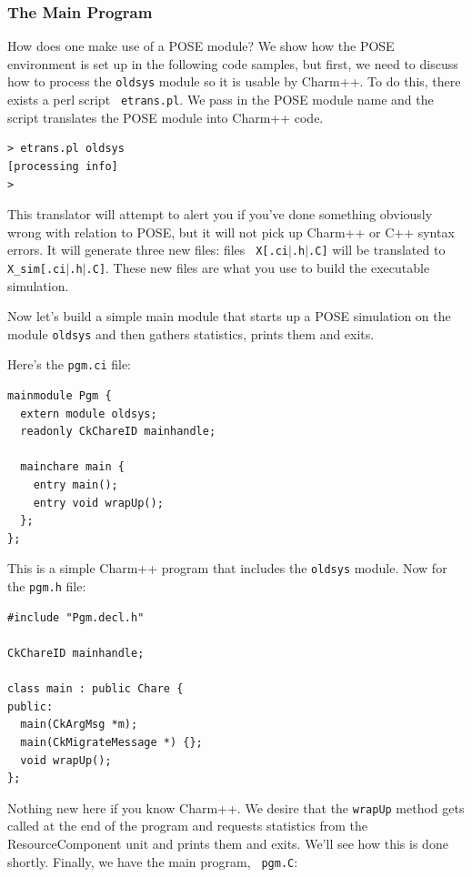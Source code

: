 \documentclass[10pt]{article}
\begin{document}
\subsubsection{The Main Program}

How does one make use of a POSE module?  We show how the POSE
environment is set up in the following code samples, but first, we
need to discuss how to process the {\tt oldsys} module so it is
usable by Charm++. To do this, there exists a perl script {\tt
etrans.pl}.  We pass in the POSE module name and the script translates
the POSE module into Charm++ code.

\begin{verbatim}
> etrans.pl oldsys
[processing info]
>
\end{verbatim}

This translator will attempt to alert you if you've done something
obviously wrong with relation to POSE, but it will not pick up Charm++
or C++ syntax errors.  It will generate three new files: files {\tt
X[.ci$|$.h$|$.C]} will be translated to {\tt X\_sim[.ci$|$.h$|$.C]}.  These
new files are what you use to build the executable simulation.

Now let's build a simple main module that starts up a POSE simulation
on the module {\tt oldsys} and then gathers statistics, prints them
and exits.

Here's the {\tt pgm.ci} file:

\begin{verbatim}
mainmodule Pgm {
  extern module oldsys;
  readonly CkChareID mainhandle;
  
  mainchare main {
    entry main();
    entry void wrapUp();
  };
};
\end{verbatim}

This is a simple Charm++ program that includes the {\tt oldsys}
module.  Now for the {\tt pgm.h} file:

\begin{verbatim}
#include "Pgm.decl.h"

CkChareID mainhandle;

class main : public Chare {
public:
  main(CkArgMsg *m);
  main(CkMigrateMessage *) {};
  void wrapUp();
};
\end{verbatim}

Nothing new here if you know Charm++.  We desire that the {\tt wrapUp}
method gets called at the end of the program and requests statistics
from the ResourceComponent unit and prints them and exits.  We'll see
how this is done shortly.  Finally, we have the main program, {\tt
pgm.C}:
\end{document}
